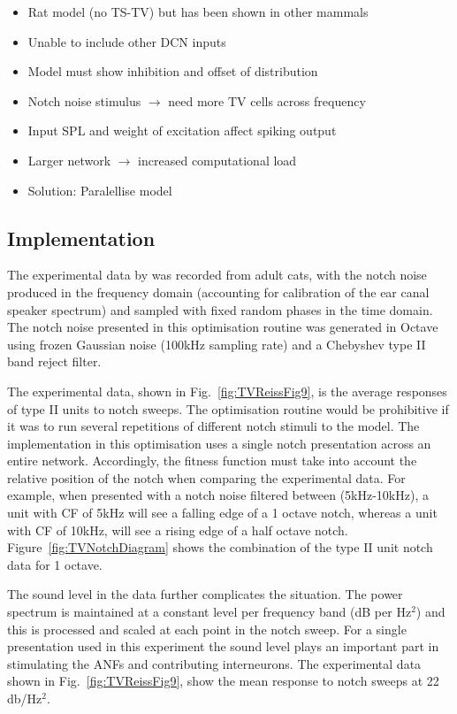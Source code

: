 \begin{itemize}
\item Rat model (no TS-TV) but has been shown in other mammals
\item Unable to include other DCN inputs
\item Model must show \DSTV inhibition and offset of distribution

\item Notch noise stimulus $\rightarrow$ need more TV cells across
  frequency
\item Input SPL and weight of excitation affect spiking output
\item Larger network $\rightarrow$ increased computational load
\item Solution: Paralellise model
\end{itemize}


\subsection{Implementation}

The experimental data by \citet{ReissYoung:2005} was recorded from adult cats,
with the notch noise produced in the frequency domain (accounting for
calibration of the ear canal speaker spectrum) and sampled with fixed random
phases in the time domain. The notch noise presented in this optimisation
routine was generated in Octave using frozen Gaussian noise (100kHz sampling
rate) and a Chebyshev type II band reject filter.

\medskip{}

The experimental data, shown in Fig.~\ref{fig:TVReissFig9}, is the average
responses of type II units to notch sweeps.  The optimisation routine would be
prohibitive if it was to run several repetitions of different notch stimuli to
the model. The implementation in this optimisation uses a single notch
presentation across an entire network. Accordingly, the fitness function must
take into account the relative position of the notch when comparing the
experimental data.  For example, when presented with a notch noise filtered
between (5kHz-10kHz), a unit with CF of 5kHz will see a falling edge of a 1
octave notch, whereas a unit with CF of 10kHz, will see a rising edge of a half
octave notch.  Figure~\ref{fig:TVNotchDiagram} shows the combination of the type
II unit notch data for 1 octave.

\medskip{}

The sound level in the \citet{ReissYoung:2005} data further complicates the
situation.  The power spectrum is maintained at a constant level per frequency
band (dB per Hz$^2$) and this is processed and scaled at each point in the notch
sweep.  For a single presentation used in this experiment the sound level plays
an important part in stimulating the ANFs and contributing interneurons.  The
experimental data shown in Fig.~\ref{fig:TVReissFig9}, show the mean response to
notch sweeps at 22 db/Hz$^2$.

